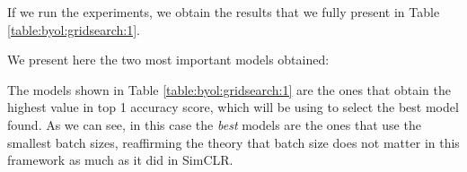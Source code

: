 If we run the experiments, we obtain the results that we fully present in Table \ref{table:byol:gridsearch:1}. 
\begin{table}[H]
    \caption{All results for BYOL's experiment on the influence of batch size.}
    \label{table:byol:gridsearch:1}
    \end{table}

We present here the two most important models obtained:

\begin{table}[H]
    \caption{Most important results for BYOL's experiment on the influence of batch size.}
    \label{table:byol:gridsearch:1}
    \end{table}

The models shown in Table \ref{table:byol:gridsearch:1} are the ones that obtain the highest value in top 1 accuracy score, which will be using to select the best model found. As we can see, in this case the \emph{best} models are the ones that use the smallest batch sizes, reaffirming the theory that batch size does not matter in this framework as much as it did in SimCLR.

